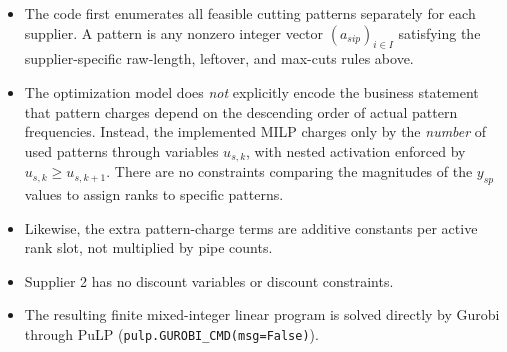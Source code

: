\begin{itemize}
    \item The code first enumerates all feasible cutting patterns separately for each supplier. A pattern is any nonzero integer vector $(a_{sip})_{i\in I}$ satisfying the supplier-specific raw-length, leftover, and max-cuts rules above.
    \item The optimization model does \emph{not} explicitly encode the business statement that pattern charges depend on the descending order of actual pattern frequencies. Instead, the implemented MILP charges only by the \emph{number} of used patterns through variables $u_{s,k}$, with nested activation enforced by $u_{s,k}\ge u_{s,k+1}$. There are no constraints comparing the magnitudes of the $y_{sp}$ values to assign ranks to specific patterns.
    \item Likewise, the extra pattern-charge terms are additive constants per active rank slot, not multiplied by pipe counts.
    \item Supplier 2 has no discount variables or discount constraints.
    \item The resulting finite mixed-integer linear program is solved directly by Gurobi through PuLP (\texttt{pulp.GUROBI\_CMD(msg=False)}).
\end{itemize}
